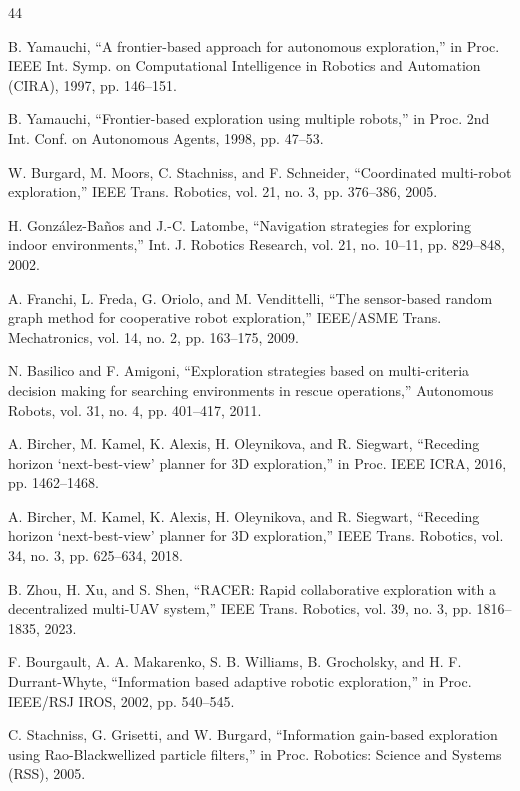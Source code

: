 \documentclass[journal]{IEEEtran}
\begin{document}
\begin{thebibliography}{44}

 B. Yamauchi, ``A frontier-based approach for autonomous exploration,'' in Proc. IEEE Int. Symp. on Computational Intelligence in Robotics and Automation (CIRA), 1997, pp. 146--151.

 B. Yamauchi, ``Frontier-based exploration using multiple robots,'' in Proc. 2nd Int. Conf. on Autonomous Agents, 1998, pp. 47--53.

 W. Burgard, M. Moors, C. Stachniss, and F. Schneider, ``Coordinated multi-robot exploration,'' IEEE Trans. Robotics, vol. 21, no. 3, pp. 376--386, 2005.

 H. González-Baños and J.-C. Latombe, ``Navigation strategies for exploring indoor environments,'' Int. J. Robotics Research, vol. 21, no. 10--11, pp. 829--848, 2002.

 A. Franchi, L. Freda, G. Oriolo, and M. Vendittelli, ``The sensor-based random graph method for cooperative robot exploration,'' IEEE/ASME Trans. Mechatronics, vol. 14, no. 2, pp. 163--175, 2009.

 N. Basilico and F. Amigoni, ``Exploration strategies based on multi-criteria decision making for searching environments in rescue operations,'' Autonomous Robots, vol. 31, no. 4, pp. 401--417, 2011.

 A. Bircher, M. Kamel, K. Alexis, H. Oleynikova, and R. Siegwart, ``Receding horizon ‘next-best-view' planner for 3D exploration,'' in Proc. IEEE ICRA, 2016, pp. 1462--1468.

 A. Bircher, M. Kamel, K. Alexis, H. Oleynikova, and R. Siegwart, ``Receding horizon ‘next-best-view' planner for 3D exploration,'' IEEE Trans. Robotics, vol. 34, no. 3, pp. 625--634, 2018.

 B. Zhou, H. Xu, and S. Shen, ``RACER: Rapid collaborative exploration with a decentralized multi-UAV system,'' IEEE Trans. Robotics, vol. 39, no. 3, pp. 1816--1835, 2023.

 F. Bourgault, A. A. Makarenko, S. B. Williams, B. Grocholsky, and H. F. Durrant-Whyte, ``Information based adaptive robotic exploration,'' in Proc. IEEE/RSJ IROS, 2002, pp. 540--545.

 C. Stachniss, G. Grisetti, and W. Burgard, ``Information gain-based exploration using Rao-Blackwellized particle filters,'' in Proc. Robotics: Science and Systems (RSS), 2005.


\end{thebibliography}
\end{document}
